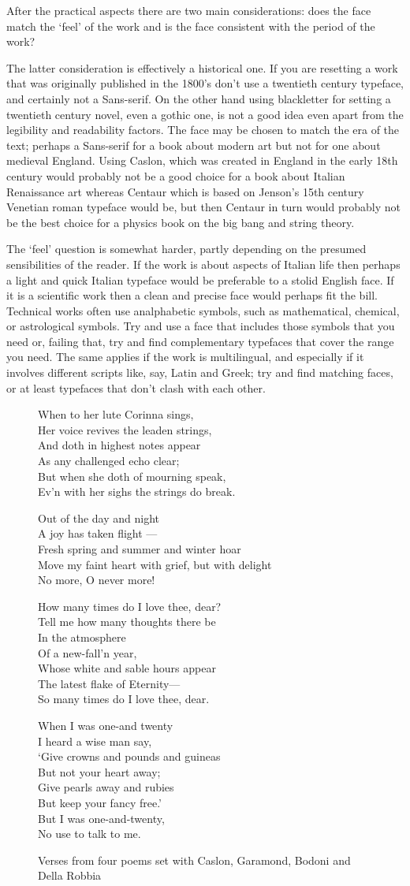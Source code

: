 \documentclass[10pt,letterpaper,extrafontsizes]{memoir}
\newcommand*{\thisfont}[5]{\fontencoding{T1}%
  \fontsize{#1}{#2}\fontfamily{#3}\fontseries{#4}\fontshape{#5}%
  \selectfont}
\newcommand*{\pickfont}[1]{\thisfont{12}{14}{#1}{m}{n}}
\newcommand*{\caslon}{\pickfont{5ca}}
\newcommand*{\garamond}{\pickfont{5gm}}
\newcommand*{\della}{\pickfont{5de}}
\newcommand*{\bodoni}{\pickfont{5bd}}
\renewcommand*{\pickfont}[1]{\thisfont{12}{14}{ppl}{m}{n}}
\newcommand*{\Shelley}{%
\hspace*{2em} Out of the day and night \\
\hspace*{2em} A joy has taken flight --- \\
Fresh spring and summer and winter hoar \\
\hspace*{1em} Move my faint heart with grief, but with delight \\
\hspace*{2em} No more, O never more!}
\newcommand*{\Beddoes}{%
How many times do I love thee, dear? \\
\hspace*{1em} Tell me how many thoughts there be \\
\hspace*{4em} In the atmosphere \\
\hspace*{4em} Of a new-fall'n year, \\
Whose white and sable hours appear \\
\hspace*{1em} The latest flake of Eternity--- \\
So many times do I love thee, dear.}
\newcommand*{\Campion}{%
When to her lute Corinna sings, \\
Her voice revives the leaden strings, \\
And doth in highest notes appear \\
As any challenged echo clear; \\
But when she doth of mourning speak, \\
Ev'n with her sighs the strings do break.}
\newcommand*{\Housman}{%
When I was one-and twenty \\
\hspace*{1em} I heard a wise man say, \\
`Give crowns and pounds and guineas \\
\hspace*{1em} But not your heart away; \\
Give pearls away and rubies \\
\hspace*{1em} But keep your fancy free.' \\
But I was one-and-twenty, \\
\hspace*{1em} No use to talk to me.}
\begin{document}
    After the practical aspects there are two main considerations: 
does the face match the `feel' of the work and is the face consistent 
with the period of the 
work? 

    The latter consideration is effectively a historical one. If you are
resetting a work that was originally published in the 1800's don't
use a twentieth century typeface, and certainly not a Sans-serif. On the
other hand using blackletter for setting a twentieth century novel, 
even a gothic one, is not a good idea even apart from the legibility and
readability factors.
    The face may be chosen to match the era of the text; perhaps a Sans-serif
for a book about modern art but not for one about medieval England. Using 
Caslon, which was created in England in the early 
18th century would 
probably not be a good choice for a book about Italian Renaissance art 
whereas Centaur which is based on Jenson's 
15th century Venetian roman
typeface would be, but then Centaur in turn would probably not be the
best choice for a physics book on the big bang and string theory. 

    The `feel' question is somewhat harder, partly depending on the 
presumed
sensibilities of the reader. If the work is about aspects of Italian
life then perhaps a light and quick Italian typeface would be 
preferable to a stolid English face. If it is a scientific work then
a clean and precise face would perhaps fit the bill. Technical
works often use analphabetic symbols, such as mathematical, chemical, or 
astrological symbols. Try and use a face that includes those symbols
that you need or, failing that, try and find complementary typefaces
that cover the range you need. The same applies if the work is 
multilingual, and especially if it involves different scripts
like, say, Latin and Greek; try and find matching faces, or at least 
typefaces that don't clash with each other.


 

\begin{figure}
\begin{adjustwidth}{-0.05\textwidth}{-0.05\textwidth}
\centering
\begin{minipage}[t]{0.52\textwidth}\caslon
\Campion
\end{minipage}
\hfill
\begin{minipage}[t]{0.52\textwidth}\garamond
\Shelley
\end{minipage}

\vspace*{2\onelineskip}

\begin{minipage}[t]{0.52\textwidth}\bodoni
\Beddoes
\end{minipage}
\hfill
\begin{minipage}[t]{0.52\textwidth}\della
\Housman
\end{minipage}
\caption{Verses from four poems set with Caslon, Garamond, Bodoni and Della Robbia} \label{fig:poems1}
\end{adjustwidth}
\end{figure}
\end{document}
